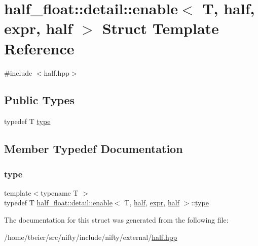 \hypertarget{structhalf__float_1_1detail_1_1enable_3_01T_00_01half_00_01expr_00_01half_01_4}{}\section{half\+\_\+float\+:\+:detail\+:\+:enable$<$ T, half, expr, half $>$ Struct Template Reference}
\label{structhalf__float_1_1detail_1_1enable_3_01T_00_01half_00_01expr_00_01half_01_4}


{\ttfamily \#include $<$half.\+hpp$>$}

\subsection*{Public Types}
\begin{DoxyCompactItemize}
\item 
typedef T \hyperlink{structhalf__float_1_1detail_1_1enable_3_01T_00_01half_00_01expr_00_01half_01_4_a80132f08c75c820e5b592597050e161f}{type}
\end{DoxyCompactItemize}


\subsection{Member Typedef Documentation}
\mbox{\label{structhalf__float_1_1detail_1_1enable_3_01T_00_01half_00_01expr_00_01half_01_4_a80132f08c75c820e5b592597050e161f}} 
\subsubsection{\texorpdfstring{type}{type}}
{\footnotesize\ttfamily template$<$typename T $>$ \\
typedef T \hyperlink{structhalf__float_1_1detail_1_1enable}{half\+\_\+float\+::detail\+::enable}$<$ T, \hyperlink{classhalf__float_1_1half}{half}, \hyperlink{structhalf__float_1_1detail_1_1expr}{expr}, \hyperlink{classhalf__float_1_1half}{half} $>$\+::\hyperlink{structhalf__float_1_1detail_1_1enable_3_01T_00_01half_00_01expr_00_01half_01_4_a80132f08c75c820e5b592597050e161f}{type}}



The documentation for this struct was generated from the following file\+:\begin{DoxyCompactItemize}
\item 
/home/tbeier/src/nifty/include/nifty/external/\hyperlink{half_8hpp}{half.\+hpp}\end{DoxyCompactItemize}
